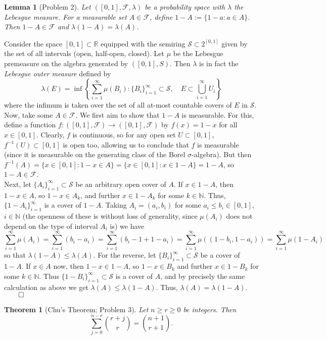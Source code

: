 \documentclass[10pt]{article}
\newcommand{\mbb}[1]{\mathbb{#1}}
\newcommand{\1}[1]{\mathbbm{1}_{#1}}
\newcommand{\mc}[1]{\mathcal{#1}}
\newcommand{\nck}[2]{{#1\choose#2}}
\newtheorem{theorem}{Theorem}
\newtheorem{lemma}{Lemma}
\begin{document}
    \begin{lemma}[Problem 2]
        Let $([0,1],\mc{F},\lambda)$ be a probability space with $\lambda$ the Lebesgue measure. For a measurable set $A\in\mc{F}$, define $1-A:=\{1-a:a\in A\}$. Then $1-A\in\mc{F}$ and $\lambda(1-A)=\lambda(A)$.
    \end{lemma}
    \hspace{5pt} Consider the space $[0,1]\subset\mbb{R}$ equipped with the semiring $\mc{S}\subset 2^{[0,1]}$ given by the set of all intervals (open, half-open, closed). Let $\mu$ be the Lebesgue premeasure on the algebra generated by $([0,1],S)$.
    Then $\lambda$ is in fact the {\it Lebesgue outer measure} defined by
    \[\lambda(E)=\inf\left\{\sum_{i=1}^\infty\mu(B_i):\{B_i\}_{i=1}^\infty\subset \mc{S},\quad E\subset\bigcup_{i=1}^\infty U_i\right\}\] 
    where the infimum is taken over the set of all at-most countable covers of $E$ in $\mc{S}$. Now, take some $A\in \mc{F}$. We first aim to show that $1-A$ is measurable. For this, define a function $f:([0,1],\mc{F})\rightarrow([0,1],\mc{F})$ by $f(x)=1-x$ for all $x\in[0,1]$. Clearly, $f$ is continuous, so
    for any open set $U\subset[0,1]$, $f^{-1}(U)\subset[0,1]$ is open too, allowing us to conclude that $f$ is measurable (since it is measurable on the generating class of the Borel $\sigma$-algebra). But then $f^{-1}(A)=\{x\in[0,1]:1-x\in A\}=\{x\in[0,1]:x\in1-A\}=1-A$, so $1-A\in\mc{F}$.\\[5pt]
    Next, let $\{A_i\}_{i=1}^\infty\subset\mc{S}$ be an arbitrary open cover of $A$. If $x\in1-A$, then $1-x\in A$, so $1-x\in A_k$, and further $x\in 1-A_k$ for some $k\in\mbb{N}$. Thus, $\{1-A_i\}_{i=1}^\infty$ is a cover of $1-A$. Taking $A_i=(a_i,b_i)$ for some $a_i\leq b_i\in[0,1]$, $i\in\mbb{N}$ (the openness of these is without loss of generality, since $\mu(A_i)$ does not depend on the type of interval $A_i$ is)
    we have
    \[\sum_{i=1}^\infty \mu(A_i)=\sum_{i=1}^\infty(b_i-a_i)=\sum_{i=1}^\infty (b_i-1+1-a_i)=\sum_{i=1}^\infty\mu((1-b_i,1-a_i))=\sum_{i=1}^\infty\mu(1-A_i)\]
    so that $\lambda(1-A)\leq\lambda(A)$. For the reverse, let $\{B_i\}_{i=1}^\infty\subset\mc{S}$ be a cover of $1-A$. If $x\in A$ now, then $1-x\in1-A$, so $1-x\in B_k$ and further $x\in1-B_k$ for some $k\in\mbb{N}$. Thus $\{1-B_i\}_{i=1}^\infty\subset\mc{S}$ is a cover of $A$, and by precisely the same calculation as above we get $\lambda(A)\leq\lambda(1-A)$. Thus, $\lambda(A)=\lambda(1-A).$\hfill{$\qed$}\\[5pt]
    \begin{theorem}[Chu's Theorem; Problem 3]
        Let $n\geq r\geq 0$ be integers. Then
        \[\sum_{j=0}^{n-r}\nck{r+j}{r}=\nck{n+1}{r+1}.\]    
    \end{theorem}
\end{document}
